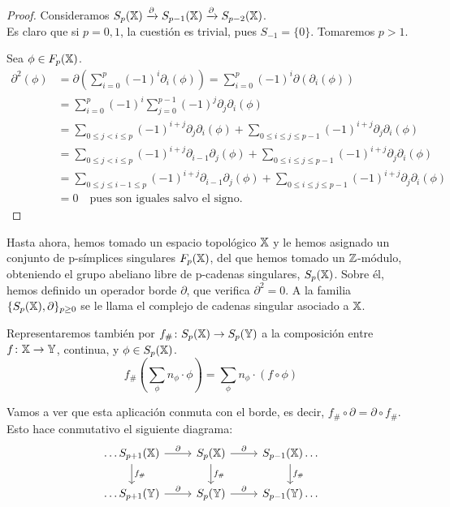 \begin{proof}
  Consideramos $S_p({\mathbb X}) \xrightarrow{\partial} S_{p-1}({\mathbb X}) \xrightarrow{\partial} S_{p-2}({\mathbb X})$. \\
  Es claro que si $p = 0, 1$, la cuestión es trivial, pues $S_{-1} = \{0\}$. Tomaremos $p > 1$.

  Sea $\phi \in F_{p}({\mathbb X})$.
  \begin{align*}
    \partial^2(\phi) &= \partial(\sum_{i = 0}^p (-1)^i \partial_i(\phi)) = \sum_{i = 0}^p (-1)^i \partial(\partial_i(\phi)) \\
                     &= \sum_{i = 0}^p (-1)^i \sum_{j = 0}^{p-1} (-1)^j \partial_j \partial_i(\phi) \\
                     &= \sum_{0 \leq j < i \leq p} (-1)^{i + j} \partial_j \partial_i(\phi)
                        + \sum_{0 \leq i \leq j \leq p-1} (-1)^{i + j} \partial_j \partial_i(\phi) \\
                     &= \sum_{0 \leq j < i \leq p} (-1)^{i + j} \partial_{i-1} \partial_j(\phi)
                        + \sum_{0 \leq i \leq j \leq p-1} (-1)^{i + j} \partial_j \partial_i(\phi) \\
                     &= \sum_{0 \leq j \leq i-1 \leq p} (-1)^{i + j} \partial_{i-1} \partial_j(\phi)
                        + \sum_{0 \leq i \leq j \leq p-1} (-1)^{i + j} \partial_j \partial_i(\phi) \\
                     &= 0 \quad \text{pues son iguales salvo el signo.}
  \end{align*}
\end{proof}

Hasta ahora, hemos tomado un espacio topológico ${\mathbb X}$ y le hemos asignado un conjunto de p-símplices singulares $F_{p}({\mathbb X})$, del que
hemos tomado un $\mathbb{Z}$-módulo, obteniendo el grupo abeliano libre de p-cadenas singulares, $S_p({\mathbb X})$. Sobre él, hemos definido un
operador borde $\partial$, que verifica $\partial^2 = 0$. A la familia $\{S_p({\mathbb X}), \partial\}_{p \geq 0}$ se le llama el complejo de cadenas
singular asociado a ${\mathbb X}$.

Representaremos también por $f_\# \colon S_p({\mathbb X}) \to S_p({\mathbb Y})$ a la composición entre \\
$f \colon {\mathbb X} \to {\mathbb Y}$, continua, y $\phi \in S_p({\mathbb X})$.
\[ f_\#(\sum_\phi n_\phi \cdot \phi) = \sum_\phi n_\phi \cdot (f \circ \phi) \]

Vamos a ver que esta aplicación conmuta con el borde, es decir, $f_\# \circ \partial = \partial \circ f_\#$. Esto hace conmutativo el siguiente diagrama:
\[
  \begin{tikzcd}
    \dots S_{p+1}(\X) \arrow{r}{\partial} \arrow{d}{f_\#} & S_p(\X) \arrow{r}{\partial} \arrow{d}{f_\#} & S_{p-1}(\X) \arrow{d}{f_\#} \dots \\
    \dots S_{p+1}(\Y) \arrow{r}{\partial}                 & S_p(\Y) \arrow{r}{\partial}                 & S_{p-1}(\Y) \dots
  \end{tikzcd}
\]

